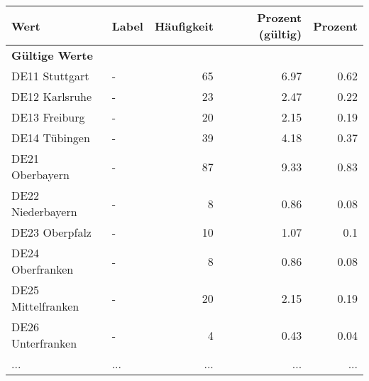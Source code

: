      \begin{longtable}{Xlrrr}
     \toprule
     \textbf{Wert} & \textbf{Label} & \textbf{Häufigkeit} & \textbf{Prozent (gültig)} & \textbf{Prozent} \\
     \endhead
     \midrule
     \multicolumn{5}{l}{\textbf{Gültige Werte}}\\
        \multicolumn{1}{X}{DE11 Stuttgart} & - & \num{65} & \num[round-mode=places,round-precision=2]{6.97} & \num[round-mode=places,round-precision=2]{0.62} \\
        \multicolumn{1}{X}{DE12 Karlsruhe} & - & \num{23} & \num[round-mode=places,round-precision=2]{2.47} & \num[round-mode=places,round-precision=2]{0.22} \\
        \multicolumn{1}{X}{DE13 Freiburg} & - & \num{20} & \num[round-mode=places,round-precision=2]{2.15} & \num[round-mode=places,round-precision=2]{0.19} \\
        \multicolumn{1}{X}{DE14 Tübingen} & - & \num{39} & \num[round-mode=places,round-precision=2]{4.18} & \num[round-mode=places,round-precision=2]{0.37} \\
        \multicolumn{1}{X}{DE21 Oberbayern} & - & \num{87} & \num[round-mode=places,round-precision=2]{9.33} & \num[round-mode=places,round-precision=2]{0.83} \\
        \multicolumn{1}{X}{DE22 Niederbayern} & - & \num{8} & \num[round-mode=places,round-precision=2]{0.86} & \num[round-mode=places,round-precision=2]{0.08} \\
        \multicolumn{1}{X}{DE23 Oberpfalz} & - & \num{10} & \num[round-mode=places,round-precision=2]{1.07} & \num[round-mode=places,round-precision=2]{0.1} \\
        \multicolumn{1}{X}{DE24 Oberfranken} & - & \num{8} & \num[round-mode=places,round-precision=2]{0.86} & \num[round-mode=places,round-precision=2]{0.08} \\
        \multicolumn{1}{X}{DE25 Mittelfranken} & - & \num{20} & \num[round-mode=places,round-precision=2]{2.15} & \num[round-mode=places,round-precision=2]{0.19} \\
        \multicolumn{1}{X}{DE26 Unterfranken} & - & \num{4} & \num[round-mode=places,round-precision=2]{0.43} & \num[round-mode=places,round-precision=2]{0.04} \\
       ... & ... & ... & ... & ... \\

\end{longtable}
